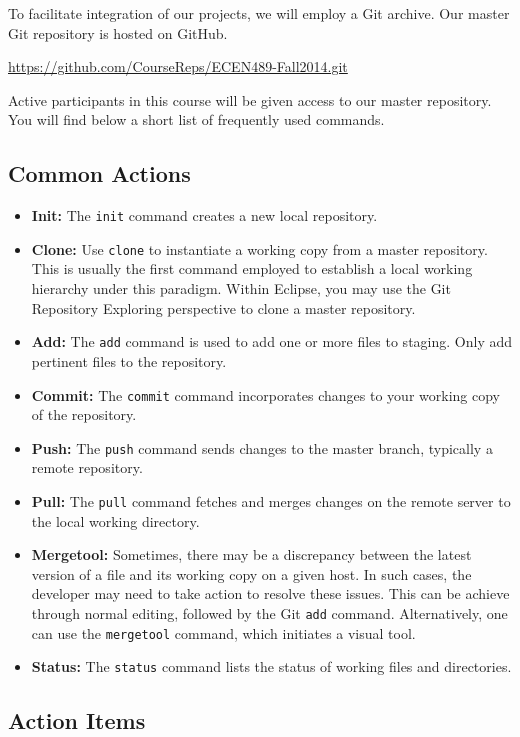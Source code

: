 \documentclass[11pt]{article}
\begin{document}
To facilitate integration of our projects, we will employ a Git archive.
Our master Git repository is hosted on GitHub.
\begin{center}
\url{https://github.com/CourseReps/ECEN489-Fall2014.git}
\end{center}
Active participants in this course will be given access to our master repository.
You will find below a short list of frequently used commands.


\subsection*{Common Actions}

\begin{itemize}
\item \textbf{Init:}
The \texttt{init} command creates a new local repository.
\item \textbf{Clone:}
Use \texttt{clone} to instantiate a working copy from a master repository.
This is usually the first command employed to establish a local working hierarchy under this paradigm.
Within Eclipse, you may use the Git Repository Exploring perspective to clone a master repository.
\item \textbf{Add:}
The \texttt{add} command is used to add one or more files to staging.
Only add pertinent files to the repository.
\item \textbf{Commit:}
The \texttt{commit} command incorporates changes to your working copy of the repository.
\item \textbf{Push:}
The \texttt{push} command sends changes to the master branch, typically a remote repository.
\item \textbf{Pull:}
The \texttt{pull} command fetches and merges changes on the remote server to the local working directory.
\item \textbf{Mergetool:}
Sometimes, there may be a discrepancy between the latest version of a file and its working copy on a given host.
In such cases, the developer may need to take action to resolve these issues.
This can be achieve through normal editing, followed by the Git \texttt{add} command.
Alternatively, one can use the  \texttt{mergetool} command, which initiates a visual tool.
\item \textbf{Status:}
The \texttt{status} command lists the status of working files and directories.
\end{itemize}


\subsection*{Action Items}
\end{document}

